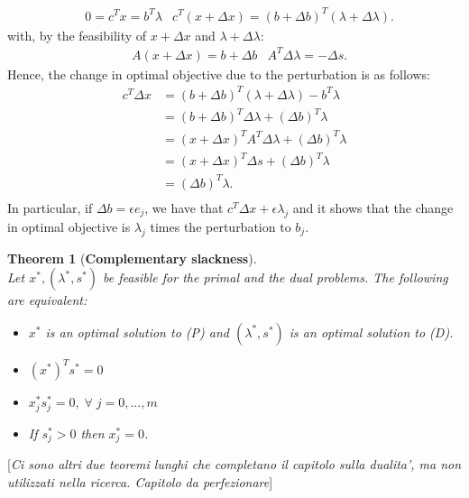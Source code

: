 \documentclass[a4paper,10 pt,titlepage,twoside]{book}
\theoremstyle{plain}
\newtheorem{thm}{Theorem}[chapter]
\theoremstyle{definition}
\theoremstyle{remark}
\begin{document}
\begin{align*}
&0=c^{T}x=b^{T}\lambda  &c^{T}(x + \Delta x)=\left(b+\Delta b\right)^{T}\left(\lambda+\Delta \lambda\right).
\end{align*}
with, by the feasibility of $x + \Delta x$ and $\lambda+\Delta \lambda$:
\begin{align*}
&A(x + \Delta x)=b+\Delta b
&A^{T}\Delta\lambda=-\Delta s.
\end{align*}
Hence, the change in optimal objective due to the perturbation is as follows:
\begin{align*}
c^{T}\Delta x&=\left(b+\Delta b\right)^{T}\left(\lambda+\Delta \lambda\right) - b^{T}\lambda\\
&=\left(b+\Delta b\right)^{T}\Delta \lambda+\left(\Delta b\right)^{T}\lambda\\
&=\left(x+\Delta x\right)^{T}A^{T}\Delta \lambda+\left(\Delta b\right)^{T}\lambda\\
&=\left(x+\Delta x\right)^{T}\Delta s+\left(\Delta b\right)^{T}\lambda\\
&=\left(\Delta b\right)^{T}\lambda.\\
\end{align*} 
In particular, if $\Delta b = \epsilon e_{j}$, we have that $c^{T}\Delta x+\epsilon \lambda_{j}$ and it shows that the change in optimal objective is $\lambda_{j}$ times the perturbation to $b_{j}$.
\begin{thm}[\textbf{Complementary slackness}] \ \\
	Let $x^{*},(\lambda^{*},s^{*})$ be feasible for the primal and the dual problems. The following are equivalent:
	\begin{itemize}
		\item $x^{*}$ is an optimal solution to (P) and $(\lambda^{*},s^{*})$ is an optimal solution to (D).
		\item $(x^{*})^{T}s^{*}=0$
		\item $x^{*}_{j}s^{*}_{j}=0,\;\forall\; j=0,...,m$
		\item If $s^{*}_{j} > 0$ then $x^{*}_{j}= 0$.
	\end{itemize}
\end{thm}
[\textit{Ci sono altri due teoremi lunghi che completano il capitolo sulla dualita', ma non utilizzati nella ricerca. Capitolo da perfezionare}]
%
%
\end{document}
